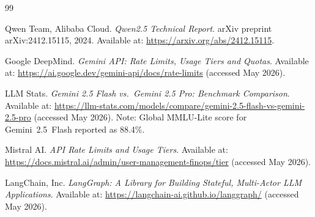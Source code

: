 \documentclass[12pt,a4paper]{report}
\begin{document}
\begin{thebibliography}{99}

Qwen Team, Alibaba Cloud.
\textit{Qwen2.5 Technical Report}.
arXiv preprint arXiv:2412.15115, 2024.
Available at: \url{https://arxiv.org/abs/2412.15115}.

Google DeepMind.
\textit{Gemini API: Rate Limits, Usage Tiers and Quotas}.
Available at: \url{https://ai.google.dev/gemini-api/docs/rate-limits}
(accessed May 2026).

LLM Stats.
\textit{Gemini 2.5 Flash vs.\ Gemini 2.5 Pro: Benchmark Comparison}.
Available at: \url{https://llm-stats.com/models/compare/gemini-2.5-flash-vs-gemini-2.5-pro}
(accessed May 2026).
Note: Global MMLU-Lite score for Gemini~2.5~Flash reported as 88.4\%.

Mistral AI.
\textit{API Rate Limits and Usage Tiers}.
Available at: \url{https://docs.mistral.ai/admin/user-management-finops/tier}
(accessed May 2026).


LangChain, Inc.
\textit{LangGraph: A Library for Building Stateful, Multi-Actor LLM Applications}.
Available at: \url{https://langchain-ai.github.io/langgraph/}
(accessed May 2026).

\end{thebibliography}
\end{document}
